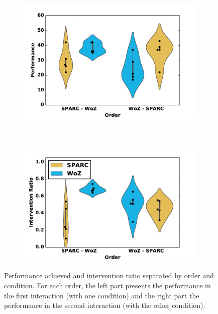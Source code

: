 \begin{figure}[ht]
	\centering
	\begin{subfigure}[t]{0.5\textwidth}
		\centering
		\includegraphics[width=1.\textwidth]{perf_divided.pdf}
	\end{subfigure}%
	~ 
	\begin{subfigure}[t]{0.5\textwidth}
		\centering
		\includegraphics[width=1.\textwidth]{ratio_divided.pdf}
	\end{subfigure}
	\caption{Performance achieved and intervention ratio separated by order and condition. For each order, the left part presents the performance in the first interaction (with one condition) and the right part the performance in the second interaction (with the other condition).}
	\label{fig:woz_separated}
\end{figure}


